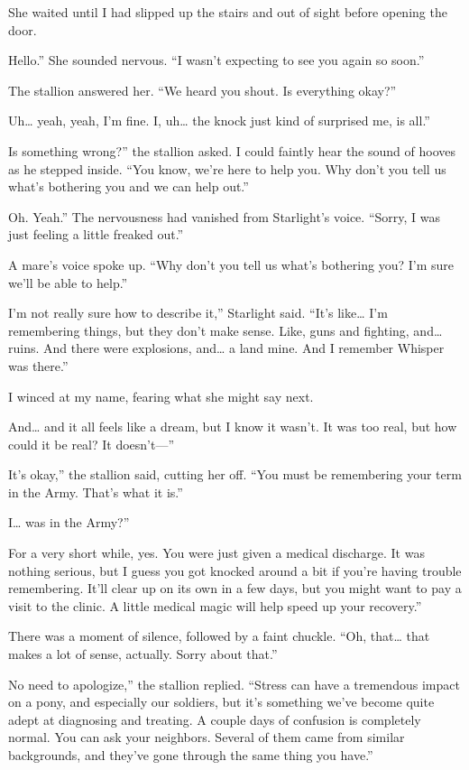 She waited until I had slipped up the stairs and out of sight before opening the door.

\leavevmode{}Hello.” She sounded nervous. “I wasn’t expecting to see you again so soon.”

The stallion answered her. “We heard you shout. Is everything okay?”

\leavevmode{}Uh… yeah, yeah, I’m fine. I, uh… the knock just kind of surprised me, is all.”

\leavevmode{}Is something wrong?” the stallion asked. I could faintly hear the sound of hooves as he stepped inside. “You know, we’re here to help you. Why don’t you tell us what’s bothering you and we can help out.”

\leavevmode{}Oh. Yeah.” The nervousness had vanished from Starlight’s voice. “Sorry, I was just feeling a little freaked out.”

A mare’s voice spoke up. “Why don’t you tell us what’s bothering you? I’m sure we’ll be able to help.”

\leavevmode{}I’m not really sure how to describe it,” Starlight said. “It’s like… I’m remembering things, but they don’t make sense. Like, guns and fighting, and… ruins. And there were explosions, and… a land mine. And I remember Whisper was there.”

I winced at my name, fearing what she might say next.

\leavevmode{}And… and it all feels like a dream, but I know it wasn’t. It was too real, but how could it be real? It doesn’t—”

\leavevmode{}It’s okay,” the stallion said, cutting her off. “You must be remembering your term in the Army. That’s what it is.”

\leavevmode{}I… was in the Army?”

\leavevmode{}For a very short while, yes. You were just given a medical discharge. It was nothing serious, but I guess you got knocked around a bit if you’re having trouble remembering. It’ll clear up on its own in a few days, but you might want to pay a visit to the clinic. A little medical magic will help speed up your recovery.”

There was a moment of silence, followed by a faint chuckle. “Oh, that… that makes a lot of sense, actually. Sorry about that.”

\leavevmode{}No need to apologize,” the stallion replied. “Stress can have a tremendous impact on a pony, and especially our soldiers, but it’s something we’ve become quite adept at diagnosing and treating. A couple days of confusion is completely normal. You can ask your neighbors. Several of them came from similar backgrounds, and they’ve gone through the same thing you have.”

